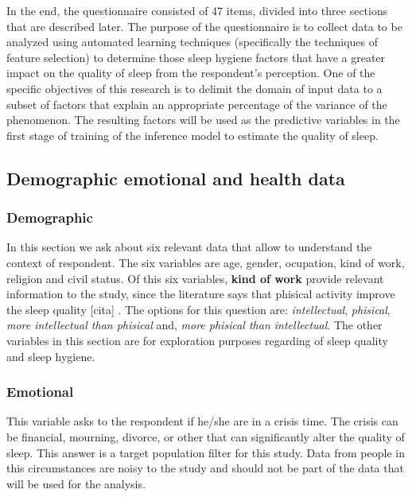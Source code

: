 \documentclass[]{book}
\begin{document}
In the end, the questionnaire consisted of 47 items, divided into three
sections that are described later. The purpose of the questionnaire is
to collect data to be analyzed using automated learning techniques
(specifically the techniques of feature selection) to determine those
sleep hygiene factors that have a greater impact on the quality of sleep
from the respondent's perception. One of the specific objectives of this
research is to delimit the domain of input data to a subset of factors
that explain an appropriate percentage of the variance of the
phenomenon. The resulting factors will be used as the predictive
variables in the first stage of training of the inference model to
estimate the quality of sleep.

\subsection{Demographic emotional and health
data}\label{demographic-emotional-and-health-data}

\subsubsection{Demographic}\label{demographic}

In this section we ask about six relevant data that allow to understand
the context of respondent. The six variables are age, gender, ocupation,
kind of work, religion and civil status. Of this six variables,
\textbf{kind of work} provide relevant information to the study, since
the literature says that phisical activity improve the sleep quality
{[}cita{]} . The options for this question are: \emph{intellectual},
\emph{phisical}, \emph{more intellectual than phisical} and, \emph{more
phisical than intellectual}. The other variables in this section are for
exploration purposes regarding of sleep quality and sleep hygiene.

\subsubsection{Emotional}\label{emotional}

This variable asks to the respondent if he/she are in a crisis time. The
crisis can be financial, mourning, divorce, or other that can
significantly alter the quality of sleep. This answer is a target
population filter for this study. Data from people in this circumstances
are noisy to the study and should not be part of the data that will be
used for the analysis.
\end{document}
